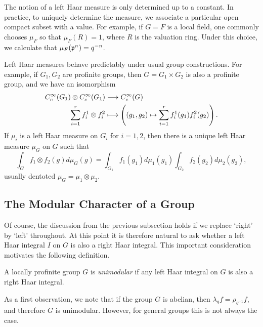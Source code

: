\begin{example}
    The notion of a left Haar measure is only determined up to a constant. In practice, to uniquely determine the measure, we associate a particular open compact subset with a value. For example, if $G=F$ is a local field, one commonly chooses $\mu_F$ so that $\mu_F(R)=1$, where $R$ is the valuation ring. Under this choice, we calculate that $\mu_F(\mathfrak{p}^n)=q^{-n}$.
\end{example}

Left Haar measures behave predictably under usual group constructions. For example, if $G_1,G_2$ are profinite groups, then $G=G_1\times G_2$ is also a profinite group, and we have an isomorphism 
\begin{align*}
    C_c^{\infty}(G_1)\otimes C_c^{\infty}(G_1)&\longrightarrow C_c^{\infty}(G)\\
    \sum_{i=1}^{r}f_i^1\otimes f_i^2 &\longmapsto \left((g_1,g_2)\mapsto \sum_{i=1}^{r}f_i^1(g_1)f_i^2(g_2)\right).
\end{align*}
If $\mu_i$ is a left Haar measure on $G_i$ for $i=1,2$, then there is a unique left Haar measure $\mu_G$ on $G$ such that 
$$\int_G f_1\otimes f_2(g)d\mu_G(g)=\int_{G_1}f_1(g_1)d\mu_1(g_1)\int_{G_2}f_2(g_2)d\mu_2(g_2),$$
usually dentoted $\mu_G=\mu_1\otimes\mu_2$.

\subsection{The Modular Character of a Group}

Of course, the discussion from the previous subsection holds if we replace `right' by `left' throughout. At this point it is therefore natural to ask whether a left Haar integral $I$ on $G$ is also a right Haar integral. This important consideration motivates the following definition.

\begin{defn}
    A locally profinite group $G$ is \textit{unimodular} if any left Haar integral on $G$ is also a right Haar integral. 
\end{defn}

As a first observation, we note that if the group $G$ is abelian, then $\lambda_g f=\rho_{g^{-1}} f$, and therefore $G$ is unimodular. However, for general groups this is not always the case. 


